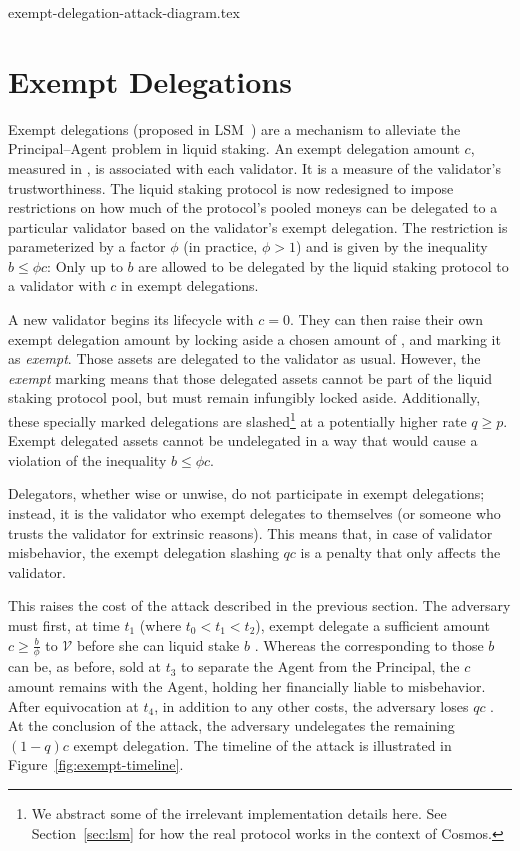 {exempt-delegation-attack-diagram.tex}

\section{Exempt Delegations}

Exempt delegations (proposed in LSM~\cite{liquidity-staking-module})
are a mechanism to alleviate the Principal--Agent problem in liquid staking.
An exempt delegation amount $c$, measured in \asset, is associated
with each validator. It is a measure of the validator's trustworthiness.
The liquid staking protocol is now redesigned to impose restrictions
on how much of the protocol's pooled moneys can be delegated to a particular
validator based on the validator's exempt delegation.
The restriction is
parameterized by a factor $\phi$ (in practice, $\phi > 1$)
and is given by the inequality $b \leq \phi c$: Only up to $b$ \assets
are allowed to be delegated by the liquid staking protocol
to a validator with $c$ \assets in exempt delegations.

A new validator begins its lifecycle with $c = 0$. They can then
raise their own exempt delegation amount by locking aside a
chosen amount of \asset, and marking it as \emph{exempt}. Those
assets are delegated to the validator as usual. However,
the \emph{exempt}
marking means that those delegated assets cannot be part of the liquid
staking protocol pool, but must remain infungibly locked aside. Additionally,
these specially marked delegations are slashed\footnote{We abstract some
of the irrelevant implementation details here. See Section~\ref{sec:lsm}
for how the real protocol works in the context of Cosmos.}
at a potentially higher rate $q \geq p$. Exempt delegated assets cannot
be undelegated in a way that would cause a violation of the inequality
$b \leq \phi c$.

Delegators, whether wise or unwise, do not participate in exempt
delegations; instead, it is the validator who exempt delegates to
themselves (or someone who trusts the validator for extrinsic reasons).
This means that, in case of validator misbehavior, the exempt delegation
slashing $qc$ is a penalty that only affects the validator.

This raises
the cost of the attack described in the previous section. The
adversary must first, at time $t_1$ (where $t_0 < t_1 < t_2$), exempt delegate a sufficient amount
$c \geq \frac{b}{\phi}$ \asset to $\mathcal{V}$ before she can liquid stake $b$ \asset.
Whereas the \stassets
corresponding to those $b$ \assets can be, as before, sold at $t_3$ to
separate the Agent from the Principal, the $c$ amount remains with the
Agent, holding her financially liable to misbehavior. After equivocation at $t_4$,
in addition to any other costs, the adversary loses $qc$ \asset. At the conclusion
of the attack, the adversary undelegates the remaining $(1 - q)c$ exempt delegation.
The timeline of the attack is illustrated in Figure~\ref{fig:exempt-timeline}.

